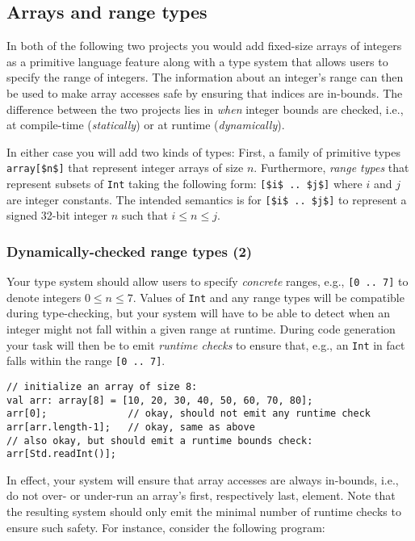 \subsection{Arrays and range types}

In both of the following two projects you would add fixed-size arrays of integers as
a primitive language feature along with a type system that allows users to specify
the range of integers.
The information about an integer's range can then be used to make array accesses safe
by ensuring that indices are in-bounds.
The difference between the two projects lies in \emph{when} integer bounds are checked,
i.e., at compile-time (\emph{statically}) or at runtime (\emph{dynamically}).

In either case you will add two kinds of types:
First, a family of primitive types \lstinline{array[$n$]} that represent integer arrays of
size $n$.
Furthermore, \emph{range types} that represent subsets of \lstinline{Int} taking the
following form:
\lstinline{[$i$ .. $j$]} where $i$ and $j$ are integer constants.
The intended semantics is for \lstinline{[$i$ .. $j$]} to represent a signed 32-bit integer
$n$ such that $i \le n \le j$.

\subsubsection{Dynamically-checked range types (2)}

Your type system should allow users to specify \emph{concrete} ranges, e.g.,
\lstinline{[0 .. 7]} to denote integers $0 \le n \le 7$. Values of \lstinline{Int} and
any range types will be compatible during type-checking, but your system will have to be
able to detect when an integer might not fall within a given range at runtime.
During code generation your task will then be to emit \emph{runtime checks} to ensure
that, e.g., an \lstinline{Int} in fact falls within the range \lstinline{[0 .. 7]}.

\begin{lstlisting}
// initialize an array of size 8:
val arr: array[8] = [10, 20, 30, 40, 50, 60, 70, 80];
arr[0];              // okay, should not emit any runtime check
arr[arr.length-1];   // okay, same as above
// also okay, but should emit a runtime bounds check:
arr[Std.readInt()];
\end{lstlisting}

In effect, your system will ensure that array accesses are always in-bounds, i.e., do not
over- or under-run an array's first, respectively last, element.
Note that the resulting system should only emit the minimal number of runtime checks to
ensure such safety. For instance, consider the following program:

